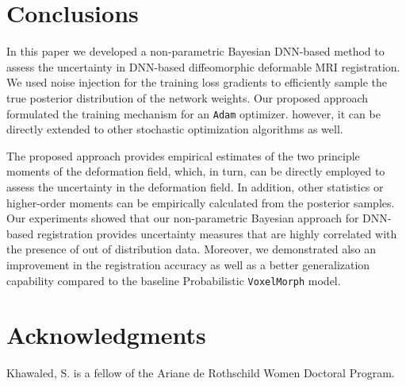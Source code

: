 \documentclass[preprint,authoryear]{elsarticle}
\begin{document}
\section{Conclusions} \label{sec:conc}
In this paper we developed a non-parametric Bayesian DNN-based method to assess the uncertainty in DNN-based diffeomorphic deformable MRI registration.
We used noise injection for the training loss gradients to efficiently sample the true posterior distribution of the network weights. Our proposed approach formulated the training mechanism for an \texttt{Adam} optimizer. however, it can be directly extended to other stochastic optimization algorithms as well.  

The proposed approach provides empirical estimates of the two principle moments of the deformation field, which, in turn, can be directly employed to assess the uncertainty in the deformation field. In addition, other statistics or higher-order moments can be empirically calculated from the posterior samples. Our experiments showed that our non-parametric Bayesian approach for DNN-based registration provides uncertainty measures that are highly correlated with the presence of out of distribution data. Moreover, we demonstrated also an improvement in the registration accuracy as well as a better generalization capability compared to the baseline Probabilistic \texttt{VoxelMorph} model. 

\section*{Acknowledgments}
Khawaled, S. is a fellow of the Ariane de Rothschild
Women Doctoral Program.

\appendix
\end{document}
